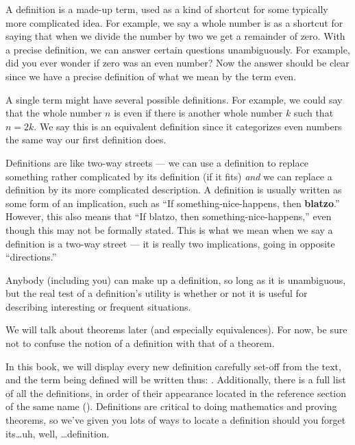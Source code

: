 \begin{para}A definition is a made-up term, used as a kind of shortcut for some typically more complicated idea.  For example, we say a whole number is  as a shortcut for saying that when we divide the number by two we get a remainder of zero.  With a precise definition, we can answer certain questions unambiguously.  For example, did you ever wonder if zero was an even number?  Now the answer should be clear since we have a precise definition of what we mean by the term even.\end{para}
%
\begin{para}A single term might have several possible definitions.  For example, we could say that the whole number $n$ is even if there is another whole number $k$ such that $n=2k$.  We say this is an equivalent definition since it categorizes even numbers the same way our first definition does.\end{para}
%
\begin{para}Definitions are like two-way streets --- we can use a definition to replace something rather complicated by its definition (if it fits) {\em and} we can replace a definition by its more complicated description.  A definition is usually written as some form of an implication, such as ``If something-nice-happens, then {\bf blatzo}.''  However, this also means that ``If blatzo, then something-nice-happens,'' even though this may not be formally stated.  This is what we mean when we say a definition is a two-way street --- it is really two implications, going in opposite ``directions.''\end{para}
%
\begin{para}Anybody (including you) can make up a definition, so long as it is unambiguous, but the real test of a definition's utility is whether or not it is useful for describing interesting or frequent situations.\end{para}
%
\begin{para}We will talk about theorems later (and especially equivalences).  For now, be sure not to confuse the notion of a definition with that of a theorem.\end{para}
%
\begin{para}In this book, we will display every new definition carefully set-off from the text, and the term being defined will be written thus: .  Additionally, there is a full list of all the definitions, in order of their appearance located in the reference section of the same name ().  Definitions are critical to doing mathematics and proving theorems, so we've given you lots of ways to locate a definition should you forget its\dots uh, well, \dots definition.\end{para}
